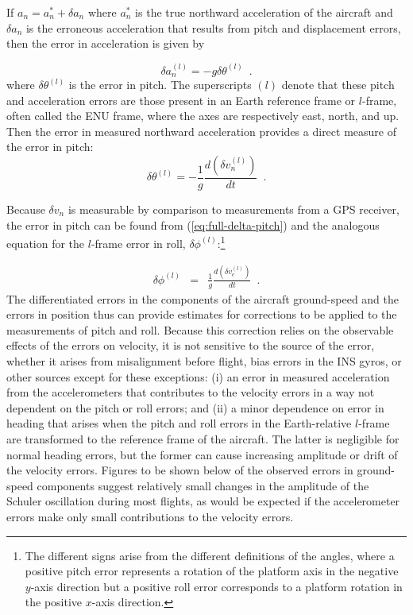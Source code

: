 \documentclass[english,british,amtd,bookmarks=false,unicode=true]{copernicus}\usepackage[]{graphicx}\usepackage[]{color}
\begin{document}
If $a_{n}=a_{n}^{*}+\delta a_{n}$ where $a_{n}^{*}$ is the true
northward acceleration of the aircraft and $\delta a_{n}$ is the
erroneous acceleration that results from pitch and displacement errors,
then the error in acceleration is given by

\begin{equation}
\delta a_{n}^{(l)}=-g\delta\theta^{(l)}\,\,\,.\label{eq:delta-an}
\end{equation}
where $\delta\theta^{(l)}$ is the error in pitch. The superscripts
$(l)$ denote that these pitch and acceleration errors are those present
in an Earth reference frame or $l$-frame, often called the ENU frame,
where the axes are respectively east, north, and up. Then the error
in measured northward acceleration provides a direct measure of the
error in pitch:\\
\begin{equation}
\delta\theta^{(l)}=-\frac{1}{g}\frac{d(\delta v_{n}^{(l)})}{dt}\,\,\,.\label{eq:full-delta-pitch}
\end{equation}


Because $\delta v_{n}$ is measurable by comparison to measurements
from a GPS receiver, the error in pitch can be found from (\ref{eq:full-delta-pitch})
and the analogous equation for the $l$-frame error in roll, $\delta\phi^{(l)}$:\footnote{The different signs arise from the different definitions of the angles,
where a positive pitch error represents a rotation of the platform
axis in the negative $y$-axis direction but a positive roll error
corresponds to a platform rotation in the positive $x$-axis direction.}

\begin{eqnarray}
\delta\phi^{(l)} & = & \frac{1}{g}\frac{d(\delta v_{e}^{(l)})}{dt}\,\,\,.\label{eq:delta-phi}
\end{eqnarray}
The differentiated errors in the components of the aircraft ground-speed
and the errors in position thus can provide estimates for corrections
to be applied to the measurements of pitch and roll. Because this
correction relies on the observable effects of the errors on velocity,
it is not sensitive to the source of the error, whether it arises
from misalignment before flight, bias errors in the INS gyros, or
other sources except for these exceptions: (i) an error in measured
acceleration from the accelerometers that contributes to the velocity
errors in a way not dependent on the pitch or roll errors; and (ii)
a minor dependence on error in heading that arises when the pitch
and roll errors in the Earth-relative $l$-frame are transformed to
the reference frame of the aircraft. The latter is negligible for
normal heading errors, but the former can cause increasing amplitude
or drift of the velocity errors. Figures to be shown below of the
observed errors in ground-speed components suggest relatively small
changes in the amplitude of the Schuler oscillation during most flights,
as would be expected if the accelerometer errors make only small contributions
to the velocity errors.
\end{document}
